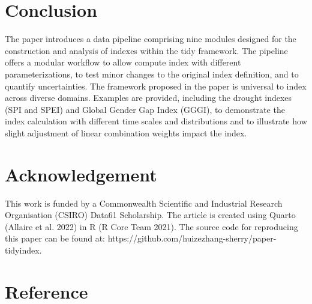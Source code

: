 \documentclass[
]{interact}
\begin{document}
\hypertarget{conclusion}{%
\section{Conclusion}\label{conclusion}}

The paper introduces a data pipeline comprising nine modules designed
for the construction and analysis of indexes within the tidy framework.
The pipeline offers a modular workflow to allow compute index with
different parameterizations, to test minor changes to the original index
definition, and to quantify uncertainties. The framework proposed in the
paper is universal to index across diverse domains. Examples are
provided, including the drought indexes (SPI and SPEI) and Global Gender
Gap Index (GGGI), to demonstrate the index calculation with different
time scales and distributions and to illustrate how slight adjustment of
linear combination weights impact the index.

\hypertarget{acknowledgement}{%
\section{Acknowledgement}\label{acknowledgement}}

This work is funded by a Commonwealth Scientific and Industrial Research
Organisation (CSIRO) Data61 Scholarship. The article is created using
Quarto (Allaire et al. 2022) in R (R Core Team 2021). The source code
for reproducing this paper can be found at:
https://github.com/huizezhang-sherry/paper-tidyindex.

\hypertarget{reference}{%
\section*{Reference}\label{reference}}
\end{document}
